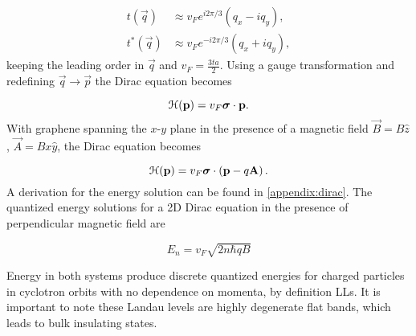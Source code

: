 \begin{align}
  t(\vec{q}) &\approx v_F e^{i 2\pi/3} \left(q_x - iq_y \right), \nonumber \\
  t^*(\vec{q}) &\approx v_F e^{-i 2\pi/3} \left(q_x + iq_y \right), \nonumber
\end{align}
keeping the leading order in $\vec{q}$ and $v_F = \tfrac{3ta}{2}$.
Using a gauge transformation and redefining $\vec{q} \rightarrow \vec{p}$ the Dirac equation becomes

\begin{equation}
  \mathcal{H}(\mathbf{p}) = v_F \bm{\sigma}\cdot \mathbf{p}.
\end{equation}
With graphene spanning the $x$-$y$ plane in the presence of a magnetic field $\vec{B} = B\hat{z}$, $\vec{A} =  Bx\hat{y}$, the Dirac equation becomes

\begin{equation}
  \mathcal{H}(\mathbf{p}) = v_F \bm{\sigma}\cdot \left(\mathbf{p} - q\mathbf{A} \right).
\end{equation}
A derivation for the energy solution can be found in \ref{appendix:dirac}.
The quantized energy solutions for a 2D Dirac equation in the presence of perpendicular magnetic field are

\begin{equation}
  E_n = v_F \sqrt{2 n \hbar qB }
\end{equation}

Energy in both systems produce discrete quantized energies for charged particles in cyclotron orbits with no dependence on momenta, by definition LLs.
It is important to note these Landau levels are highly degenerate flat bands, which leads to bulk insulating states.

